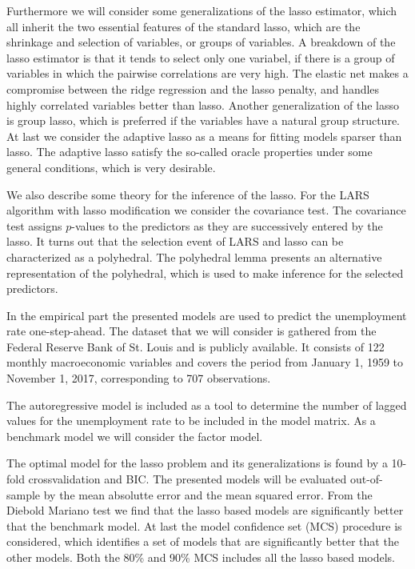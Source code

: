 Furthermore we will consider some generalizations of the lasso estimator, which all inherit the two essential features of the standard lasso, which are the shrinkage and selection of variables, or groups of variables.
A breakdown of the lasso estimator is that it tends to select only one variabel, if there is a group of variables in which the pairwise correlations are very high.
The elastic net makes a compromise between the ridge regression and the lasso penalty, and handles highly correlated variables better than lasso. 
Another generalization of the lasso is group lasso, which is preferred if the variables have a natural group structure.
At last we consider the adaptive lasso as a means for fitting models sparser than lasso.
The adaptive lasso satisfy the so-called oracle properties under some general conditions, which is very desirable. 

We also describe some theory for the inference of the lasso.
For the LARS algorithm with lasso modification we consider the covariance test.
The covariance test assigns \(p\)-values to the predictors as they are successively entered by the lasso.
It turns out that the selection event of LARS and lasso can be characterized as a polyhedral.
The polyhedral lemma presents an alternative representation of the polyhedral, which is used to make inference for the selected predictors.

In the empirical part the presented models are used to predict the unemployment rate one-step-ahead.
The dataset that we will consider is gathered from the Federal Reserve Bank of St. Louis and is publicly available.
It consists of 122 monthly macroeconomic variables and covers the period from January 1, 1959 to November 1, 2017, corresponding to 707 observations.

The autoregressive model is included as a tool to determine the number of lagged values for the unemployment rate to be included in the model matrix.
As a benchmark model we will consider the factor model.

The optimal model for the lasso problem and its generalizations is found by a 10-fold crossvalidation and BIC.
The presented models will be evaluated out-of-sample by the mean absolutte error and the mean squared error.
From the Diebold Mariano test we find that the lasso based models are significantly better that the benchmark model. 
At last the model confidence set (MCS) procedure is considered, which identifies a set of models that are significantly better that the other models.
Both the 80\% and 90\% MCS includes all the lasso based models.